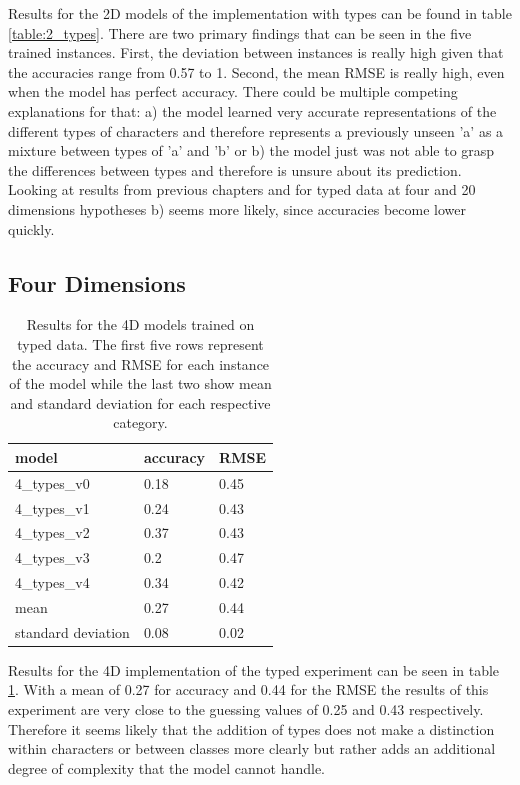 Results for the 2D models of the implementation with types can be found in table \ref{table:2_types}. There are two primary findings that can be seen in the five trained instances. First, the deviation between instances is really high given that the accuracies range from 0.57 to 1. Second, the mean RMSE is really high, even when the model has perfect accuracy. There could be multiple competing explanations for that: a) the model learned very accurate representations of the different types of characters and therefore represents a previously unseen 'a' as a mixture between types of 'a' and 'b' or b) the model just was not able to grasp the differences between types and therefore is unsure about its prediction. Looking at results from previous chapters and for typed data at four and 20 dimensions hypotheses b) seems more likely, since accuracies become lower quickly.

\subsection{Four Dimensions}

\begin{table}[!htb]
	\centering
	\caption{Results for the 4D models trained on typed data. The first five rows represent the accuracy and RMSE for each instance of the model while the last two show mean and standard deviation for each respective category.}
	\begin{tabularx}{\textwidth}{ X  X  X }
		\hline
		model & accuracy & RMSE \\ 
		\hline
		4\_types\_v0 & 0.18 &0.45 \\ 
		4\_types\_v1 & 0.24 &0.43 \\
		4\_types\_v2 & 0.37 &0.43 \\ 
		4\_types\_v3 & 0.2  &0.47 \\ 
		4\_types\_v4 & 0.34 &0.42 \\ \hline
		mean & 0.27 &  0.44\\
		standard deviation & 0.08 & 0.02\\
		\hline
	\end{tabularx}
	\label{table:4_types}
\end{table}

Results for the 4D implementation of the typed experiment can be seen in table \ref{table:4_types}. With a mean of 0.27 for accuracy and 0.44 for the RMSE the results of this experiment are very close to the guessing values of 0.25 and 0.43 respectively. Therefore it seems likely that the addition of types does not make a distinction within characters or between classes more clearly but rather adds an additional degree of complexity that the model cannot handle. 

